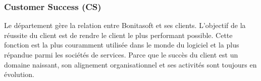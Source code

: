 \subsubsection{Customer Success (CS)}
Le département gère la relation entre Bonitasoft et ses clients. L'objectif de la réussite du client est de rendre le client le plus performant possible.
Cette fonction est la plus couramment utilisée dans le monde du logiciel et la plus répandue parmi les sociétés de services. Parce que le succès du client est un domaine naissant, son alignement organisationnel et ses activités sont toujours en évolution.
